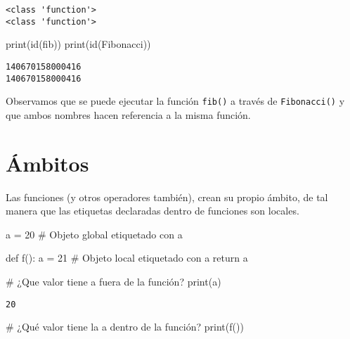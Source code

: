 \documentclass[
  letterpaper,
  DIV=11,
  numbers=noendperiod]{scrreprt}
\newenvironment{Shaded}{\begin{snugshade}}{\end{snugshade}}
\newcommand{\BuiltInTok}[1]{\textcolor[rgb]{0.00,0.23,0.31}{#1}}
\newcommand{\CommentTok}[1]{\textcolor[rgb]{0.37,0.37,0.37}{#1}}
\newcommand{\ControlFlowTok}[1]{\textcolor[rgb]{0.00,0.23,0.31}{#1}}
\newcommand{\DecValTok}[1]{\textcolor[rgb]{0.68,0.00,0.00}{#1}}
\newcommand{\KeywordTok}[1]{\textcolor[rgb]{0.00,0.23,0.31}{#1}}
\newcommand{\NormalTok}[1]{\textcolor[rgb]{0.00,0.23,0.31}{#1}}
\newcommand{\OperatorTok}[1]{\textcolor[rgb]{0.37,0.37,0.37}{#1}}
\begin{document}
\begin{verbatim}
<class 'function'>
<class 'function'>
\end{verbatim}

\begin{Shaded}
\begin{Highlighting}[]
\BuiltInTok{print}\NormalTok{(}\BuiltInTok{id}\NormalTok{(fib))}
\BuiltInTok{print}\NormalTok{(}\BuiltInTok{id}\NormalTok{(Fibonacci))}
\end{Highlighting}
\end{Shaded}

\begin{verbatim}
140670158000416
140670158000416
\end{verbatim}

Observamos que se puede ejecutar la función \texttt{fib()} a través de
\texttt{Fibonacci()} y que ambos nombres hacen referencia a la misma
función.


\chapter{Ámbitos}\label{uxe1mbitos}

Las funciones (y otros operadores también), crean su propio ámbito, de
tal manera que las etiquetas declaradas dentro de funciones son locales.

\begin{Shaded}
\begin{Highlighting}[]
\NormalTok{a }\OperatorTok{=} \DecValTok{20} \CommentTok{\# Objeto global etiquetado con a}

\KeywordTok{def}\NormalTok{ f():}
\NormalTok{    a }\OperatorTok{=} \DecValTok{21} \CommentTok{\# Objeto local etiquetado con a}
    \ControlFlowTok{return}\NormalTok{ a}
\end{Highlighting}
\end{Shaded}

\begin{Shaded}
\begin{Highlighting}[]
\CommentTok{\# ¿Que valor tiene \textquotesingle{}a\textquotesingle{} fuera de la función?}
\BuiltInTok{print}\NormalTok{(a)}
\end{Highlighting}
\end{Shaded}

\begin{verbatim}
20
\end{verbatim}

\begin{Shaded}
\begin{Highlighting}[]
\CommentTok{\# ¿Qué valor tiene la \textquotesingle{}a\textquotesingle{} dentro de la función?}
\BuiltInTok{print}\NormalTok{(f())}
\end{Highlighting}
\end{Shaded}
\end{document}
